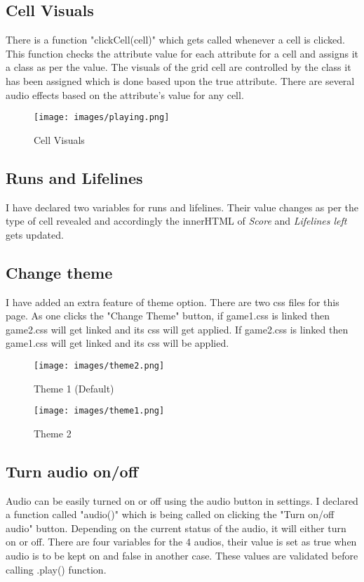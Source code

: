 \documentclass{article}
\begin{document}
\subsection{Cell Visuals}
There is a function "clickCell(cell)" which gets called whenever a cell is clicked. This function checks the attribute value for each attribute for a cell and assigns it a class as per the value. The visuals of the grid cell are controlled by the class it has been assigned which is done based upon the true attribute. There are several audio effects based on the attribute's value for any cell. 
\begin{figure}[h]
    \centering
    \texttt{[image: images/playing.png]}
    \caption{Cell Visuals}
    \label{fig:enter-label}
\end{figure}
\subsection{Runs and Lifelines}
I have declared two variables for runs and lifelines. Their value changes as per the type of cell revealed and accordingly the innerHTML of \textit{Score} and \textit{Lifelines left} gets updated.
\subsection{Change theme}
I have added an extra feature of theme option. There are two css files for this page. As one clicks the "Change Theme" button, if game1.css is linked then game2.css will get linked and its css will get applied. If game2.css is linked then game1.css will get linked and its css will be applied.
\begin{figure}[h]
    \centering
    \texttt{[image: images/theme2.png]}
    \caption{Theme 1 (Default)}
    \label{fig:enter-label}
\end{figure}
\begin{figure}[h]
    \centering
    \texttt{[image: images/theme1.png]}
    \caption{Theme 2}
    \label{fig:enter-label}
\end{figure}
\subsection{Turn audio on/off}
Audio can be easily turned on or off using the audio button in settings. I declared a function called "audio()" which is being called on clicking the "Turn on/off audio" button. Depending on the current status of the audio, it will either turn on or off. There are four variables for the 4 audios, their value is set as true when audio is to be kept on and false in another case. These values are validated before calling .play() function.
\end{document}

